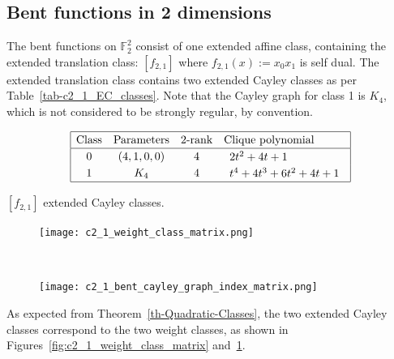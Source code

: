\documentclass[12pt,a4paper]{article}
\newcommand{\mb}[1]{\mathbb{#1}}
\newcommand{\F}{\mb{F}}
\begin{document}
\subsection{Bent functions in 2 dimensions}
%
The bent functions on $\F_2^2$ consist of one extended affine class, containing the extended translation class: $[f_{2,1}]$
where $f_{2,1}(x) := x_0 x_1$ is self dual.
The extended translation class contains two extended Cayley classes as per Table~\ref{tab-c2_1_EC_classes}.
Note that the Cayley graph for class 1 is $K_4$, which is not considered to be strongly regular, by convention.
\begin{table}[!bhpt] %
\small{
\begin{align*}
\def\arraystretch{1.2}
\begin{array}{|cccl|}
\hline
\text{Class} &
\text{Parameters} &
\text{2-rank} &
\text{Clique polynomial}
\\
\hline
0 &
(4, 1, 0, 0) &
4 &
\begin{array}{l}
2t^{2} + 4t + 1
\end{array}
\\
1 &
K_4 &
4 &
\begin{array}{l}
t^{4} + 4t^{3} + 6t^{2} + 4t + 1
\end{array}
\\
\hline
\end{array}
\end{align*}
}
\caption{$[f_{2,1}]$ extended Cayley classes.}
\label{tab-c2_1_EC_classes}
\end{table}

\begin{figure}[!ht]
\centering
\begin{minipage}{.48\textwidth}
  \centering
  \texttt{[image: c2\_1\_weight\_class\_matrix.png]}
  \label{fig:c2_1_weight_class_matrix}
\end{minipage}%
~~~~
\begin{minipage}{.48\textwidth}
  \centering
  \texttt{[image: c2\_1\_bent\_cayley\_graph\_index\_matrix.png]}
  \label{fig:c2_1_bent_cayley_graph_index_matrix}
\end{minipage}
\end{figure}
As expected from Theorem~\ref{th-Quadratic-Classes},
the two extended Cayley classes correspond to the two weight classes,
as shown in Figures~\ref{fig:c2_1_weight_class_matrix} and~\ref{fig:c2_1_bent_cayley_graph_index_matrix}.
\end{document}
